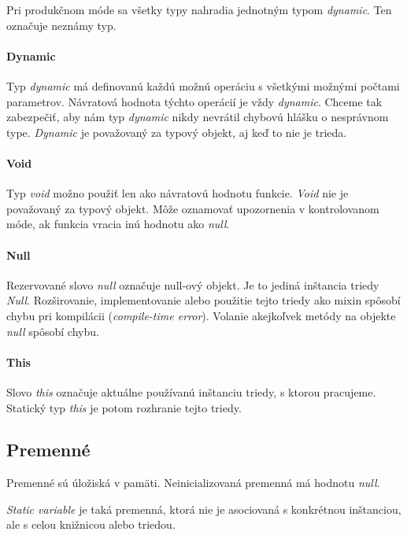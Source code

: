 Pri produkčnom móde sa všetky typy nahradia jednotným typom \emph{dynamic}. Ten označuje neznámy typ.

\paragraph{Dynamic}
Typ \emph{dynamic} má definovanú každú možnú operáciu s všetkými možnými počtami parametrov. Návratová hodnota týchto operácií je vždy \emph{dynamic}. Chceme tak zabezpečiť, aby nám typ \emph{dynamic} nikdy nevrátil chybovú hlášku o nesprávnom type. \emph{Dynamic} je považovaný za typový objekt, aj keď to nie je trieda.

\paragraph{Void}
Typ \emph{void} možno použiť len ako návratovú hodnotu funkcie. \emph{Void} nie je považovaný za typový objekt. Môže oznamovať upozornenia v kontrolovanom móde, ak funkcia vracia inú hodnotu ako \emph{null}.

\paragraph{Null}
Rezervované slovo \emph{null} označuje null-ový objekt. Je to jediná inštancia triedy \emph{Null}. Rozširovanie, implementovanie alebo použitie tejto triedy ako mixin spôsobí chybu pri kompilácii (\emph{compile-time error}).
Volanie akejkoľvek metódy na objekte \emph{null} spôsobí chybu.

\paragraph{This}%
Slovo \emph{this} označuje aktuálne používanú inštanciu triedy, s ktorou pracujeme. Statický typ \emph{this} je potom rozhranie tejto triedy.

\subsection{Premenné}
Premenné sú úložiská v pamäti. Neinicializovaná premenná má hodnotu \emph{null}.

\emph{Static variable} je taká premenná, ktorá nie je asociovaná s konkrétnou inštanciou, ale s celou knižnicou alebo triedou.

